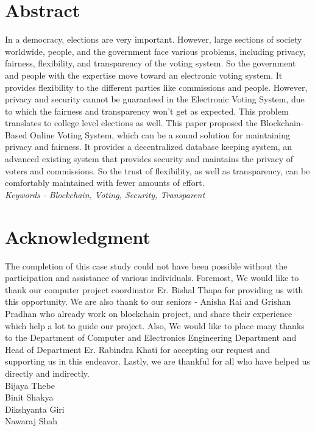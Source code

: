 \documentclass[a4paper,12pt]{report}
\begin{document}
\chapter*{Abstract}
In a democracy, elections are very important. However, large sections of society worldwide, people, and the government face various problems, including privacy, fairness, flexibility, and transparency of the voting system. So the government and people with the expertise move toward an electronic voting system. It provides flexibility to the different parties like commissions and people. However, privacy and security cannot be guaranteed in the Electronic Voting System, due to which the fairness and transparency won’t get as expected. This problem translates to college level elections as well. This paper proposed the Blockchain-Based Online Voting System, which can be a sound solution for maintaining privacy and fairness. It provides a decentralized database keeping system, an advanced  existing system that provides security and maintains the privacy of voters and commissions. So the trust of flexibility, as well as transparency, can be comfortably maintained with fewer amounts of effort.
\\
\textit{Keywords - Blockchain, Voting, Security, Transparent}
\chapter*{Acknowledgment}
The completion of this case study could not have been possible without the participation and assistance of various individuals. Foremost, We would  like to thank our computer project coordinator Er. Bishal Thapa for providing us with this opportunity.  We are also thank to our seniors - Anisha Rai and Grishan Pradhan who already work on blockchain project, and share their experience which help a lot to guide our project. Also, We would like to place many thanks to the Department of Computer and Electronics Engineering Department and Head of Department Er. Rabindra Khati for accepting our request and supporting us in this endeavor. Lastly, we are thankful for all who have helped us directly and indirectly.\\
Bijaya Thebe\\
Binit Shakya\\
Dikshyanta Giri\\
Nawaraj Shah

\renewcommand*\contentsname{Table of Contents}
\tableofcontents


\newpage
\end{document}
